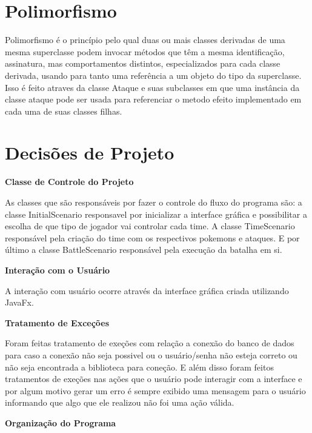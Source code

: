 \documentclass[12pt]{article}
\begin{document}
\section{Polimorfismo}

Polimorfismo é o princípio pelo qual duas ou mais classes derivadas de uma mesma superclasse podem invocar métodos que têm a mesma identificação, assinatura, mas comportamentos distintos, especializados para cada classe derivada, usando para tanto uma referência a um objeto do tipo da superclasse. Isso é feito atraves da classe Ataque e suas subclasses em que uma instância da classe ataque pode ser usada para referenciar o metodo efeito implementado em cada uma de suas classes filhas.

\section{Decisões de Projeto}
\begin{center}
	\textbf{Classe de Controle do Projeto}
\end{center}

As classes que são responsáveis por fazer o controle do fluxo do programa são: a classe InitialScenario responsavel por inicializar a interface gráfica e possibilitar a escolha de que tipo de jogador vai controlar cada time. A classe TimeScenario responsável pela criação do time com os respectivos pokemons e ataques. E por último a classe BattleScenario responsável pela execução da batalha em si.

\begin{center}
	\textbf{Interação com o Usuário}
\end{center}

A interação com usuário ocorre através da interface gráfica criada utilizando JavaFx.

\begin{center}
	\textbf{Tratamento de Exceções}
\end{center}

Foram feitas tratamento de exeções com relação a conexão do banco de dados para caso a conexão não seja possivel ou o usuário/senha não esteja correto ou não seja encontrada a biblioteca para coneção. E além disso foram feitos tratamentos de exeções nas ações que o usuário pode interagir com a interface e por algum motivo gerar um erro é sempre exibido uma mensagem para o usuário informando que algo que ele realizou não foi uma ação válida.

\begin{center}
	\textbf{Organização do Programa}
\end{center}
\end{document}
